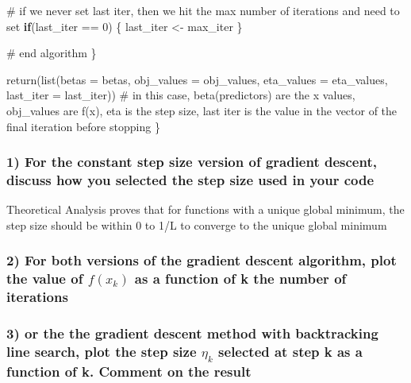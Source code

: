 \documentclass[
  letterpaper,
  DIV=11,
  numbers=noendperiod]{scrartcl}
\newenvironment{Shaded}{\begin{snugshade}}{\end{snugshade}}
\newcommand{\AttributeTok}[1]{\textcolor[rgb]{0.40,0.45,0.13}{#1}}
\newcommand{\CommentTok}[1]{\textcolor[rgb]{0.37,0.37,0.37}{#1}}
\newcommand{\ControlFlowTok}[1]{\textcolor[rgb]{0.00,0.23,0.31}{\textbf{#1}}}
\newcommand{\DecValTok}[1]{\textcolor[rgb]{0.68,0.00,0.00}{#1}}
\newcommand{\FunctionTok}[1]{\textcolor[rgb]{0.28,0.35,0.67}{#1}}
\newcommand{\NormalTok}[1]{\textcolor[rgb]{0.00,0.23,0.31}{#1}}
\newcommand{\OtherTok}[1]{\textcolor[rgb]{0.00,0.23,0.31}{#1}}
\newcommand{\SpecialCharTok}[1]{\textcolor[rgb]{0.37,0.37,0.37}{#1}}
\begin{document}
\begin{Shaded}
\begin{Highlighting}[]
    \CommentTok{\# if we never set last iter, then we hit the max number of iterations and need to set}
    \ControlFlowTok{if}\NormalTok{(last\_iter }\SpecialCharTok{==} \DecValTok{0}\NormalTok{) \{ last\_iter }\OtherTok{\textless{}{-}}\NormalTok{ max\_iter \}}
    
    \CommentTok{\# end algorithm}
\NormalTok{  \}}
  
  \FunctionTok{return}\NormalTok{(}\FunctionTok{list}\NormalTok{(}\AttributeTok{betas =}\NormalTok{ betas, }\AttributeTok{obj\_values =}\NormalTok{ obj\_values, }\AttributeTok{eta\_values =}\NormalTok{ eta\_values, }\AttributeTok{last\_iter =}\NormalTok{ last\_iter)) }\CommentTok{\# in this case, beta(predictors) are the x values, obj\_values are f(x), eta is the step size, last iter is the value in the vector of the final iteration before stopping}
\NormalTok{\}}
\end{Highlighting}
\end{Shaded}

\subsubsection{1) For the constant step size version of gradient
descent, discuss how you selected the step size used in your
code}\label{for-the-constant-step-size-version-of-gradient-descent-discuss-how-you-selected-the-step-size-used-in-your-code}

Theoretical Analysis proves that for functions with a unique global
minimum, the step size should be within 0 to 1/L to converge to the
unique global minimum

\subsubsection{\texorpdfstring{2) For both versions of the gradient
descent algorithm, plot the value of \(f(x_k)\) as a function of k the
number of
iterations}{2) For both versions of the gradient descent algorithm, plot the value of f(x\_k) as a function of k the number of iterations}}\label{for-both-versions-of-the-gradient-descent-algorithm-plot-the-value-of-fx_k-as-a-function-of-k-the-number-of-iterations}

\subsubsection{\texorpdfstring{3) or the the gradient descent method
with backtracking line search, plot the step size \(η_k\) selected at
step k as a function of k. Comment on the
result}{3) or the the gradient descent method with backtracking line search, plot the step size η\_k selected at step k as a function of k. Comment on the result}}\label{or-the-the-gradient-descent-method-with-backtracking-line-search-plot-the-step-size-ux3b7_k-selected-at-step-k-as-a-function-of-k.-comment-on-the-result}
\end{document}
